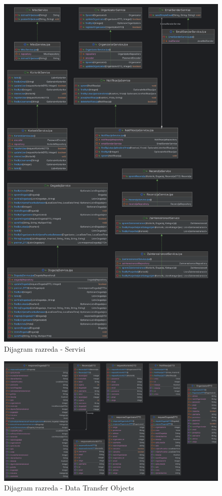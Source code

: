 			\begin{figure}[H]
				\includegraphics[scale=0.13]{dijagramiKlasa/servisi.png} %
				\centering
				\caption{Dijagram razreda - Servisi}
				\label{fig:promjene}
			\end{figure}
			
			\begin{figure}[H]
				\includegraphics[scale=0.5]{dijagramiKlasa/dtos.png} %
				\centering
				\caption{Dijagram razreda - Data Transfer Objects}
				\label{fig:promjene}
			\end{figure}
			
